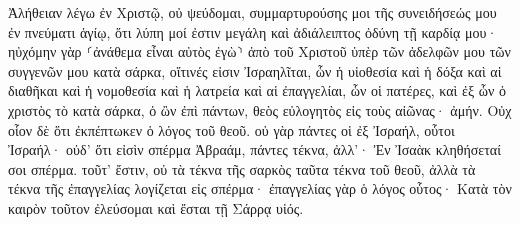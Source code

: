\documentclass{openreader}
\begin{document}
Ἀλήθειαν λέγω ἐν Χριστῷ, οὐ ψεύδομαι, συμμαρτυρούσης μοι τῆς συνειδήσεώς μου ἐν πνεύματι ἁγίῳ, 
ὅτι λύπη μοί ἐστιν μεγάλη καὶ ἀδιάλειπτος ὀδύνη τῇ καρδίᾳ μου· 
ηὐχόμην γὰρ ⸂ἀνάθεμα εἶναι αὐτὸς ἐγὼ⸃ ἀπὸ τοῦ Χριστοῦ ὑπὲρ τῶν ἀδελφῶν μου τῶν συγγενῶν μου κατὰ σάρκα, 
οἵτινές εἰσιν Ἰσραηλῖται, ὧν ἡ υἱοθεσία καὶ ἡ δόξα καὶ αἱ διαθῆκαι καὶ ἡ νομοθεσία καὶ ἡ λατρεία καὶ αἱ ἐπαγγελίαι, 
ὧν οἱ πατέρες, καὶ ἐξ ὧν ὁ χριστὸς τὸ κατὰ σάρκα, ὁ ὢν ἐπὶ πάντων, θεὸς εὐλογητὸς εἰς τοὺς αἰῶνας· ἀμήν. 
Οὐχ οἷον δὲ ὅτι ἐκπέπτωκεν ὁ λόγος τοῦ θεοῦ. οὐ γὰρ πάντες οἱ ἐξ Ἰσραήλ, οὗτοι Ἰσραήλ· 
οὐδ’ ὅτι εἰσὶν σπέρμα Ἀβραάμ, πάντες τέκνα, ἀλλ’· Ἐν Ἰσαὰκ κληθήσεταί σοι σπέρμα. 
τοῦτ’ ἔστιν, οὐ τὰ τέκνα τῆς σαρκὸς ταῦτα τέκνα τοῦ θεοῦ, ἀλλὰ τὰ τέκνα τῆς ἐπαγγελίας λογίζεται εἰς σπέρμα· 
ἐπαγγελίας γὰρ ὁ λόγος οὗτος· Κατὰ τὸν καιρὸν τοῦτον ἐλεύσομαι καὶ ἔσται τῇ Σάρρᾳ υἱός. 
\end{document}
